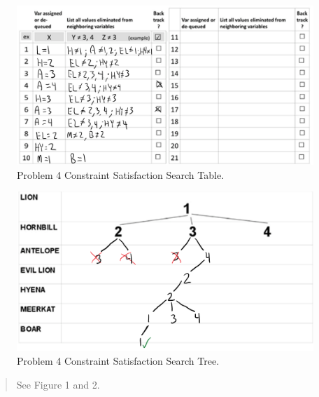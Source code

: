 \documentclass[11pt]{article}
\newenvironment{problem}[2][Problem]{\begin{trivlist}
\item[\hskip \labelsep {\bfseries #1}\hskip \labelsep {\bfseries #2.}]}{\end{trivlist}}
\begin{document}
\begin{problem}{4}
	\begin{figure}
		\includegraphics[scale=1]{cse545_hw2_p4_1.PNG}
		\caption{Problem 4 Constraint Satisfaction Search Table.}
		\label{fig.bfs}
	\end{figure}
	\begin{figure}
		\includegraphics[scale=1]{cse545_hw2_p4_2.PNG}
		\caption{Problem 4 Constraint Satisfaction Search Tree.}
		\label{fig.bfs}
	\end{figure}
	\begin{verse}
		See Figure 1 and 2.
	\end{verse}
\end{problem}
\end{document}
